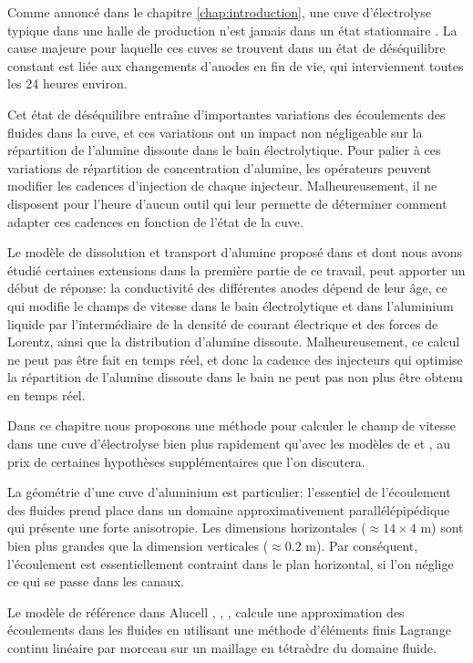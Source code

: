 Comme annoncé dans le chapitre \ref{chap:introduction}, une cuve
d'électrolyse typique dans une halle de production n'est jamais dans
un état stationnaire \cite{Steiner2009,Flotron2013}. La cause
majeure pour laquelle ces cuves se trouvent dans un état de
déséquilibre constant est liée aux changements d'anodes en fin de vie,
qui interviennent toutes les 24 heures environ.

Cet état de déséquilibre entraîne d'importantes variations des
écoulements des fluides dans la cuve, et ces variations ont un impact
non négligeable sur la répartition de l'alumine dissoute dans le bain
électrolytique. Pour palier à ces variations de répartition de
concentration d'alumine, les opérateurs peuvent modifier les cadences
d'injection de chaque injecteur. Malheureusement, il ne disposent pour
l'heure d'aucun outil qui leur permette de déterminer comment adapter
ces cadences en fonction de l'état de la cuve.

Le modèle de dissolution et transport d'alumine proposé dans
\cite{Hofer2011} et dont nous avons étudié certaines extensions dans
la première partie de ce travail, peut apporter un début de réponse: la
conductivité des différentes anodes dépend de leur âge, ce qui modifie
le champs de vitesse dans le bain électrolytique et dans l'aluminium
liquide par l'intermédiaire de la densité de courant
électrique et des forces de Lorentz, ainsi que la distribution d'alumine
dissoute. Malheureusement, ce calcul ne peut pas être fait en temps
réel, et donc la cadence des injecteurs qui optimise la répartition de
l'alumine dissoute dans le bain ne peut pas non plus être obtenu en
temps réel.

Dans ce chapitre nous proposons une méthode pour calculer le champ de
vitesse dans une cuve d'électrolyse bien plus rapidement qu'avec les
modèles de \cite{Steiner2009} et \cite{Hofer2011}, au prix de
certaines hypothèses supplémentaires que l'on discutera.

La géométrie d'une cuve d'aluminium est particulier: l'essentiel de
l'écoulement des fluides prend place dans un domaine approximativement
parallélépipédique qui présente une forte anisotropie. Les dimensions
horizontales ($\approx \num{14}\times\num{4}$ \si{\meter}) sont bien plus
grandes que la dimension verticales ($\approx \num{0.2}$ \si{\meter}). Par
conséquent, l'écoulement est essentiellement contraint dans le plan
horizontal, si l'on néglige ce qui se passe dans les canaux.

Le modèle de référence dans Alucell \cite{Steiner2009},
\cite{Flotron2013}, \cite{Hofer2011}, \cite{Rochat2016} calcule une
approximation des écoulements dans les fluides en utilisant une
méthode d'éléments finis Lagrange continu linéaire par morceau sur un
maillage en tétraèdre du domaine fluide.

